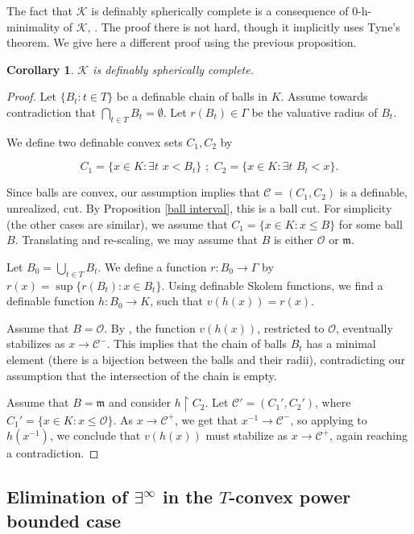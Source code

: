 \documentclass[11pt]{amsart}
\newtheorem{corollary}[theorem]{Corollary}
\theoremstyle{definition}
\newcommand{\CK}{{\mathcal K}}
\newcommand{\CC}{{\mathcal C}}
\newcommand{\CO}{{\mathcal O}}
\newcommand{\0}{\emptyset}
\def\bm{\mathfrak m}
\begin{document}
The fact that $\CK$ is definably spherically complete is a consequence of $0$-h-minimality of $\CK$, \cite[Lemma 2.7.1]{hensel-min}. The proof there is not hard, though it implicitly uses Tyne's theorem. We give here a different proof using the previous proposition.
\begin{corollary} 
$\CK$ is definably spherically complete.
\end{corollary}
\begin{proof} 
Let $\{B_t:t\in T\}$ be a definable chain of balls in $K$. Assume towards contradiction that  $\bigcap_{t\in T} B_t= \emptyset$. Let $r(B_t)\in \Gamma$ be the valuative radius of $B_t$.

We define two definable convex sets $C_1,C_2$ by

\[C_1=\{x\in K: \exists t \,\, x<B_t\}\,\,;\,\, C_2=\{x\in K: \exists t \,\, B_t<x\}.\]

Since balls are convex,  our assumption implies that $\CC=(C_1,C_2)$ is a definable, unrealized, cut. By Proposition \ref{ball interval}, this is a ball cut.  For simplicity (the other cases are similar), we assume that $C_1=\{ x\in K: x\leq B\}$ for some ball $B$. Translating and re-scaling, we may assume that $B$ is either $\CO$ or $\bm$.

Let  $B_0=\bigcup\limits_{t\in T} B_t$. We define a function $r:B_0\to \Gamma$ 
by $r(x)=\sup\{r(B_t):x\in B_t\}$. Using definable Skolem functions, we find a definable function $h:B_0\to K$, such that $v(h(x))=r(x)$. 

Assume that $B=\CO$. By \cite[Proposition 4.2]{vdDries-Tconvex}, the function $v(h(x))$, restricted  to $\CO$, eventually stabilizes as $x\to \CC^-$. This implies that the  chain of balls $B_t$ has a minimal element (there is a bijection between the balls and their radii), contradicting our assumption that the intersection of the chain is empty.  


Assume that  $B=\bm$ and  consider $h \restriction C_2$. Let $\CC'=(C_1',C_2')$, where $C_1'=\{x\in K : x\leq \CO\}$. As $x\to \CC^+$, we get that $x^{-1}\to \CC^-$, so applying \cite[Proposition 4.2]{vdDries-Tconvex} to $h(x^{-1})$, we conclude that $v(h(x))$ must stabilize as $x\to \CC^+$, again reaching a contradiction.
\end{proof}



\subsection{Elimination of $\exists^\infty$ in the $T$-convex power bounded case}
\end{document}
